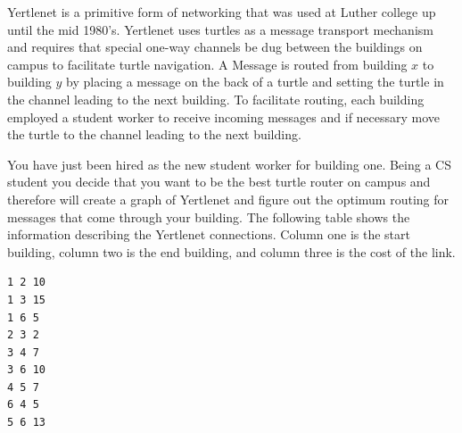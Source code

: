 \documentclass[11pt]{exam}
\begin{document}
\begin{questions}
\newpage
\question
Yertlenet is a primitive form of networking that was used at Luther college up until the mid 1980's.  Yertlenet uses turtles as a message transport mechanism and requires that special one-way channels be dug between the buildings on campus to facilitate turtle navigation. A Message is routed from building $x$ to building $y$ by placing a message on the back of a turtle and setting the turtle in the channel leading to the next building.  To facilitate routing, each building employed a student worker to receive incoming messages and if necessary move the turtle to the channel leading to the next building.

You have just been hired as the new student worker for building one. Being a CS student you decide that you want to be the best turtle router on campus and therefore will create a graph of Yertlenet and figure out the optimum routing for messages that come through your building. The following table shows the information describing the Yertlenet connections. Column one is the start building, column two is the end building, and column three is the cost of the link.

\begin{verbatim}
1 2 10
1 3 15
1 6 5
2 3 2
3 4 7
3 6 10
4 5 7
6 4 5
5 6 13
\end{verbatim}

\end{questions}
\end{document}

